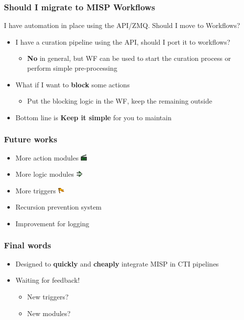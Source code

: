 \begin{frame}
    \frametitle{Should I migrate to MISP Workflows}
    I have automation in place using the API/ZMQ. Should I move to Workflows?
    \vspace{1em}
    \begin{itemize}
        \item I have a curation pipeline using the API, should I port it to workflows?
        \begin{itemize}
            \item \textbf{No} in general, but WF can be used to start the curation process or perform simple pre-processing
        \end{itemize}
        \item What if I want to \textbf{block} some actions
        \begin{itemize}
            \item Put the blocking logic in the WF, keep the remaining outside
        \end{itemize}
        \item Bottom line is \textbf{Keep it simple} for you to maintain
    \end{itemize}
\end{frame}

\begin{frame}
    \frametitle{Future works}
    \begin{itemize}
        \item More action modules \includegraphics[width=12px]{pictures/sc-action-icon.png}
        \item More logic modules \includegraphics[width=12px]{pictures/sc-condition-icon.png}
        \item More triggers \includegraphics[width=12px]{pictures/sc-event-icon.png}
        \item Recursion prevention system
        \item Improvement for logging
    \end{itemize}
\end{frame}

\begin{frame}
    \frametitle{Final words}
    \begin{itemize}
        \item Designed to \textbf{quickly} and \textbf{cheaply} integrate MISP in CTI pipelines
        \item Waiting for feedback!
        \begin{itemize}
            \item New triggers?
            \item New modules?
        \end{itemize}
    \end{itemize}
\end{frame}

